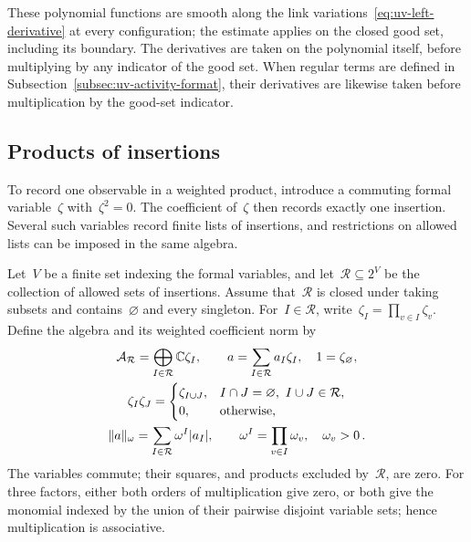 These polynomial functions are smooth along the link variations~\eqref{eq:uv-left-derivative} at every configuration; the estimate applies on the closed good set, including its boundary.
The derivatives are taken on the polynomial itself, before multiplying by any indicator of the good set.
When regular terms are defined in Subsection~\ref{subsec:uv-activity-format}, their derivatives are likewise taken before multiplication by the good-set indicator.

\subsection{Products of insertions}\label{subsec:uv-markers}

To record one observable in a weighted product, introduce a commuting formal variable~$\zeta$ with~$\zeta^2=0$.
The coefficient of~$\zeta$ then records exactly one insertion.
Several such variables record finite lists of insertions, and restrictions on allowed lists can be imposed in the same algebra.

Let~$V$ be a finite set indexing the formal variables, and let~$\mathcal R\subseteq2^V$ be the collection of allowed sets of insertions.
Assume that~$\mathcal R$ is closed under taking subsets and contains~$\varnothing$ and every singleton.
For~$I\in\mathcal R$, write~$\zeta_I=\prod_{v\in I}\zeta_v$.
Define the algebra and its weighted coefficient norm by
\begin{equation}\label{eq:uv-marker-algebra}
 \begin{gathered}
 \mathcal A_{\mathcal R}=\bigoplus_{I\in\mathcal R}\mathbb C\zeta_I,\qquad
 a=\sum_{I\in\mathcal R}a_I\zeta_I,\quad 1=\zeta_\varnothing,\\
 \zeta_I\zeta_J=
 \begin{cases}\zeta_{I\cup J},&I\cap J=\varnothing,\ I\cup J\in\mathcal R,\\0,&\text{otherwise},\end{cases}\\
 \|a\|_\omega=\sum_{I\in\mathcal R}\omega^I|a_I|,\qquad
 \omega^I=\prod_{v\in I}\omega_v,\quad \omega_v>0\,.
 \end{gathered}
\end{equation}
The variables commute; their squares, and products excluded by~$\mathcal R$, are zero. For three factors, either both orders of multiplication give zero, or both give the monomial indexed by the union of their pairwise disjoint variable sets; hence multiplication is associative.

